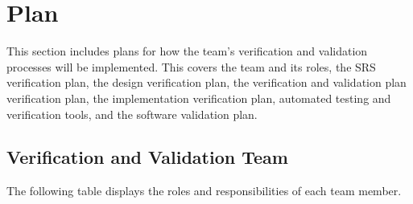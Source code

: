 \documentclass[12pt, titlepage]{article}
\begin{document}

\newpage

\section{Plan}
\hspace{2em}This section includes plans for how the team's verification and validation processes will
be implemented. This covers the team and its roles, the SRS verification plan, the design
verification plan, the verification and validation plan verification plan, the implementation
verification plan, automated testing and verification tools, and the software validation plan.

\subsection{Verification and Validation Team}

\hspace{2em}The following table displays the roles and responsibilities of each team member.
\end{document}
